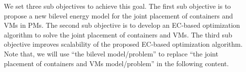  We set three sub objectives to achieve this goal. The first sub objective is to propose a new bilevel energy model for the joint placement of containers and VMs in PMs. The second sub objective is to develop an EC-based optimization algorithm to solve the joint placement of containers and VMs. The third sub objective improves scalability of the proposed EC-based optimization algorithm. Note that, we will use ``the bilevel model/problem'' to replace ``the joint placement of containers and VMs model/problem'' in the following content. 

